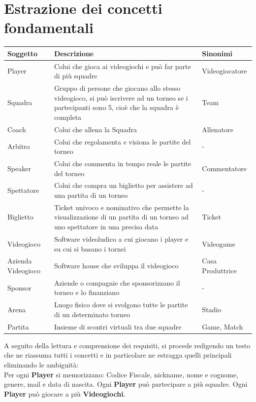 \documentclass[a4paper,12pt]{report}
\begin{document}
\section{Estrazione dei concetti fondamentali}
\renewcommand{\arraystretch}{1.5}
\setlength{\arrayrulewidth}{0.5mm}
\begin{tabular}{|m{2cm}|m{8cm}|m{3cm}|}
	\hline\rowcolor{pink}
	Soggetto & Descrizione & Sinonimi\\
	\hline\hline
	Player & Colui che gioca ai videogiochi e può far parte di più squadre & Videogiocatore\\
	\hline
	Squadra & Gruppo di persone che giocano allo stesso videogioco, si può iscrivere ad un torneo se i partecipanti sono 5, cioè che la squadra è completa& Team\\
	\hline
	Coach & Colui che allena la Squadra & Allenatore\\
	\hline
	Arbitro & Colui che regolamenta e visiona le partite del torneo & -\\
	\hline
	Speaker & Colui che commenta in tempo reale le partite del torneo & Commentatore\\
	\hline
	Spettatore & Colui che compra un biglietto per assistere ad una partita di un torneo & -\\
	\hline
	Biglietto  & Ticket univoco e nominativo che permette la visualizzazione di un partita di un torneo ad uno spettatore in una precisa data & Ticket\\
	\hline
	Videogioco & Software videoludico a cui giocano i player e su cui si basano i tornei & Videogame\\
	\hline
	Azienda Videogioco & Software house che sviluppa il videogioco & Casa Produttrice\\
	\hline
	Sponsor & Aziende o compagnie che sponsorizzano il torneo e lo finanziano & -\\
	\hline
	Arena & Luogo fisico dove si svolgono tutte le partite di un determinato torneo & Stadio\\
	\hline
	Partita & Insieme di scontri virtuali tra due squadre & Game, Match\\
	\hline
\end{tabular}

%
%
A seguito della lettura e comprensione dei requisiti, si procede redigendo un testo che ne
riassuma tutti i concetti e in particolare ne estragga quelli principali eliminando le ambiguità:\\

Per ogni \textbf{Player} si memorizzano: Codice Fiscale, nickname, nome e cognome, genere, mail e data di nascita. Ogni \textbf{Player} può partecipare a più squadre. Ogni \textbf{Player} può giocare a più \textbf{Videogiochi}.
\end{document}
